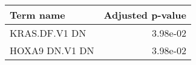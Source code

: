 \begin{tabular}{lr}
\toprule
     Term name &  Adjusted p-value \\
\midrule
 KRAS.DF.V1 DN &          3.98e-02 \\
HOXA9 DN.V1 DN &          3.98e-02 \\
\bottomrule
\end{tabular}
